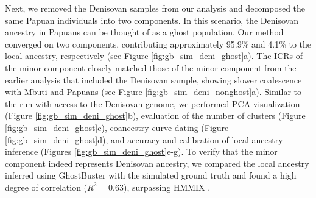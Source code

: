 Next, we removed the Denisovan samples from our analysis and decomposed the same Papuan individuals into two components. In this scenario, the Denisovan ancestry in Papuans can be thought of as a ghost population. Our method converged on two components, contributing approximately 95.9\% and 4.1\% to the local ancestry, respectively (see Figure \ref{fig:gb_sim_deni_ghost}a). The ICRs of the minor component closely matched those of the minor component from the earlier analysis that included the Denisovan sample, showing slower coalescence with Mbuti and Papuans (see Figure \ref{fig:gb_sim_deni_nonghost}a). Similar to the run with access to the Denisovan genome, we performed PCA visualization (Figure \ref{fig:gb_sim_deni_ghost}b), evaluation of the number of clusters (Figure \ref{fig:gb_sim_deni_ghost}c), coancestry curve dating (Figure \ref{fig:gb_sim_deni_ghost}d), and accuracy and calibration of local ancestry inference (Figures \ref{fig:gb_sim_deni_ghost}e-g). To verify that the minor component indeed represents Denisovan ancestry, we compared the local ancestry inferred using GhostBuster with the simulated ground truth and found a high degree of correlation ($R^2 = 0.63$), surpassing HMMIX \cite{skov2018detecting}.

